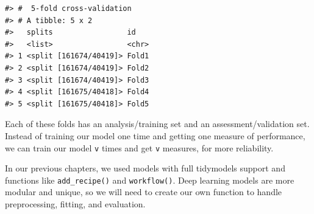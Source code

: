 \documentclass[
]{krantz}
\begin{document}
\begin{verbatim}
#> #  5-fold cross-validation 
#> # A tibble: 5 x 2
#>   splits                 id   
#>   <list>                 <chr>
#> 1 <split [161674/40419]> Fold1
#> 2 <split [161674/40419]> Fold2
#> 3 <split [161674/40419]> Fold3
#> 4 <split [161675/40418]> Fold4
#> 5 <split [161675/40418]> Fold5
\end{verbatim}

Each of these folds has an analysis/training set and an assessment/validation set. Instead of training our model one time and getting one measure of performance, we can train our model \texttt{v} times and get \texttt{v} measures, for more reliability.

In our previous chapters, we used models with full tidymodels support and functions like \texttt{add\_recipe()} and \texttt{workflow()}. Deep learning models are more modular and unique, so we will need to create our own function to handle preprocessing, fitting, and evaluation.
\end{document}
